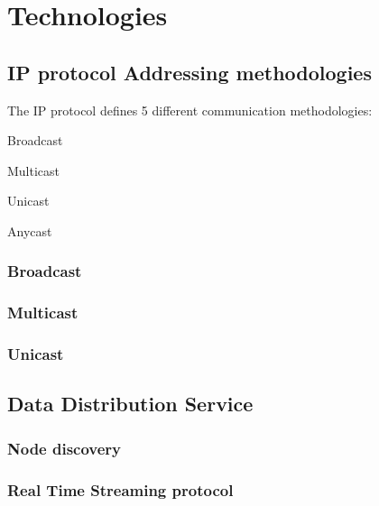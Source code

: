 \chapter{Technologies}

\section{IP protocol Addressing methodologies}

The IP protocol defines 5 different communication methodologies\cite{MISSING REF}:
\begin{inparaenum}[{}]
	\renewcommand{\labelsep}{,,,dsf}	
	\item Broadcast
	\item Multicast
	\item Unicast
	\item Anycast
				
\end{inparaenum}

\subsection{Broadcast}
\subsection{Multicast}
\subsection{Unicast}

\section{Data Distribution Service}

\subsection{Node discovery}

\subsection{Real Time Streaming protocol}